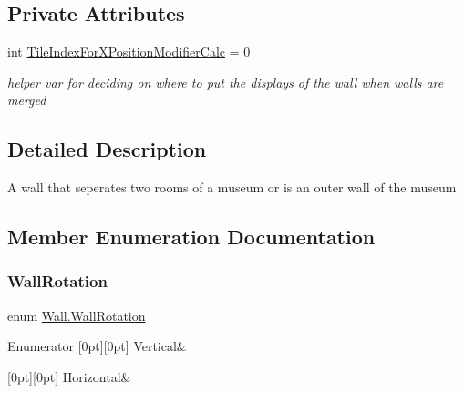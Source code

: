 \subsection*{Private Attributes}
\begin{DoxyCompactItemize}
\item 
int \mbox{\hyperlink{class_wall_a0923767dab07b7c3018ce3a6ceacd306}{Tile\+Index\+For\+X\+Position\+Modifier\+Calc}} = 0
\begin{DoxyCompactList}\small\item\em helper var for deciding on where to put the displays of the wall when walls are merged \end{DoxyCompactList}\end{DoxyCompactItemize}


\subsection{Detailed Description}
A wall that seperates two rooms of a museum or is an outer wall of the museum 



\subsection{Member Enumeration Documentation}
\mbox{\label{class_wall_a0ff16a0e73bfc8f0d89c5fd6849e3a97}} 
\subsubsection{\texorpdfstring{Wall\+Rotation}{WallRotation}}
{\footnotesize\ttfamily enum \mbox{\hyperlink{class_wall_a0ff16a0e73bfc8f0d89c5fd6849e3a97}{Wall.\+Wall\+Rotation}}\hspace{0.3cm}{\ttfamily [strong]}}

\begin{DoxyEnumFields}{Enumerator}
[0pt][0pt]{}\mbox{\label{class_wall_a0ff16a0e73bfc8f0d89c5fd6849e3a97a06ce2a25e5d12c166a36f654dbea6012}} 
Vertical&\\
\hline

[0pt][0pt]{}\mbox{\label{class_wall_a0ff16a0e73bfc8f0d89c5fd6849e3a97ac1b5fa03ecdb95d4a45dd1c40b02527f}} 
Horizontal&\\
\hline

\end{DoxyEnumFields}
\mbox{\label{class_wall_a1366d94ac70428624a6703d7db89638d}} 
